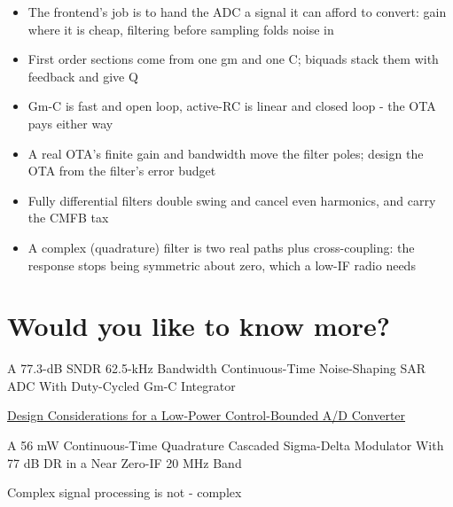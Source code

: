 \begin{itemize}
\tightlist
\item
  The frontend's job is to hand the ADC a signal it can afford to
  convert: gain where it is cheap, filtering before sampling folds noise
  in
\item
  First order sections come from one gm and one C; biquads stack them
  with feedback and give Q
\item
  Gm-C is fast and open loop, active-RC is linear and closed loop - the
  OTA pays either way
\item
  A real OTA's finite gain and bandwidth move the filter poles; design
  the OTA from the filter's error budget
\item
  Fully differential filters double swing and cancel even harmonics, and
  carry the CMFB tax
\item
  A complex (quadrature) filter is two real paths plus cross-coupling:
  the response stops being symmetric about zero, which a low-IF radio
  needs
\end{itemize}

\section{Would you like to know
more?}\label{would-you-like-to-know-more}

A 77.3-dB SNDR 62.5-kHz Bandwidth Continuous-Time Noise-Shaping SAR ADC
With Duty-Cycled Gm-C Integrator 

\href{https://ntnuopen.ntnu.no/ntnu-xmlui/handle/11250/2824253}{Design
Considerations for a Low-Power Control-Bounded A/D Converter}

A 56 mW Continuous-Time Quadrature Cascaded Sigma-Delta Modulator With
77 dB DR in a Near Zero-IF 20 MHz Band 

Complex signal processing is not - complex

